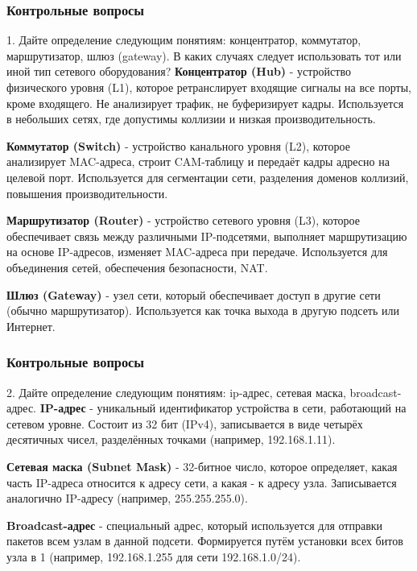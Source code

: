 \begin{frame}
\frametitle{Контрольные вопросы}

\begin{block}{1. Дайте определение следующим понятиям: концентратор, коммутатор, маршрутизатор, шлюз (gateway). В каких случаях следует использовать тот или иной тип сетевого оборудования?}
\textbf{Концентратор (Hub)} - устройство физического уровня (L1), которое ретранслирует входящие сигналы на все порты, кроме входящего. Не анализирует трафик, не буферизирует кадры. Используется в небольших сетях, где допустимы коллизии и низкая производительность.

\textbf{Коммутатор (Switch)} - устройство канального уровня (L2), которое анализирует MAC-адреса, строит CAM-таблицу и передаёт кадры адресно на целевой порт. Используется для сегментации сети, разделения доменов коллизий, повышения производительности.

\textbf{Маршрутизатор (Router)} - устройство сетевого уровня (L3), которое обеспечивает связь между различными IP-подсетями, выполняет маршрутизацию на основе IP-адресов, изменяет MAC-адреса при передаче. Используется для объединения сетей, обеспечения безопасности, NAT.

\textbf{Шлюз (Gateway)} - узел сети, который обеспечивает доступ в другие сети (обычно маршрутизатор). Используется как точка выхода в другую подсеть или Интернет.
\end{block}
\end{frame}

\begin{frame}
\frametitle{Контрольные вопросы}

\begin{block}{2. Дайте определение следующим понятиям: ip-адрес, сетевая маска, broadcast-адрес.}
\textbf{IP-адрес} - уникальный идентификатор устройства в сети, работающий на сетевом уровне. Состоит из 32 бит (IPv4), записывается в виде четырёх десятичных чисел, разделённых точками (например, 192.168.1.11).

\textbf{Сетевая маска (Subnet Mask)} - 32-битное число, которое определяет, какая часть IP-адреса относится к адресу сети, а какая - к адресу узла. Записывается аналогично IP-адресу (например, 255.255.255.0).

\textbf{Broadcast-адрес} - специальный адрес, который используется для отправки пакетов всем узлам в данной подсети. Формируется путём установки всех битов узла в 1 (например, 192.168.1.255 для сети 192.168.1.0/24).
\end{block}
\end{frame}

